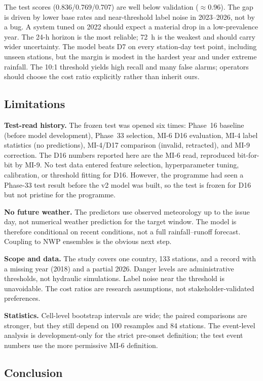 \documentclass[conference]{IEEEtran}
\begin{document}
The test scores (0.836/0.769/0.707) are well below validation ($\approx$0.96). The gap is driven by lower base rates and near-threshold label noise in 2023--2026, not by a bug. A system tuned on 2022 should expect a material drop in a low-prevalence year. The 24-h horizon is the most reliable; 72~h is the weakest and should carry wider uncertainty. The model beats D7 on every station-day test point, including unseen stations, but the margin is modest in the hardest year and under extreme rainfall. The 10:1 threshold yields high recall and many false alarms; operators should choose the cost ratio explicitly rather than inherit ours.

\subsection{Limitations}

\textbf{Test-read history.} The frozen test was opened six times: Phase~16 baseline (before model development), Phase~33 selection, MI-6 D16 evaluation, MI-4 label statistics (no predictions), MI-4/D17 comparison (invalid, retracted), and MI-9 correction. The D16 numbers reported here are the MI-6 read, reproduced bit-for-bit by MI-9. No test data entered feature selection, hyperparameter tuning, calibration, or threshold fitting for D16. However, the programme had seen a Phase-33 test result before the v2 model was built, so the test is frozen for D16 but not pristine for the programme.

\textbf{No future weather.} The predictors use observed meteorology up to the issue day, not numerical weather prediction for the target window. The model is therefore conditional on recent conditions, not a full rainfall--runoff forecast. Coupling to NWP ensembles is the obvious next step.

\textbf{Scope and data.} The study covers one country, 133 stations, and a record with a missing year (2018) and a partial 2026. Danger levels are administrative thresholds, not hydraulic simulations. Label noise near the threshold is unavoidable. The cost ratios are research assumptions, not stakeholder-validated preferences.

\textbf{Statistics.} Cell-level bootstrap intervals are wide; the paired comparisons are stronger, but they still depend on 100 resamples and 84 stations. The event-level analysis is development-only for the strict pre-onset definition; the test event numbers use the more permissive MI-6 definition.

\subsection{Conclusion}
\end{document}
